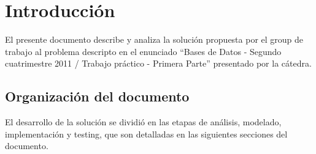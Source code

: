 \section{Introducci\'on}
El presente documento describe y analiza la soluci\'on propuesta por el group de trabajo al problema descripto en el 
enunciado ``Bases de Datos - Segundo cuatrimestre 2011 / Trabajo pr\'actico - Primera Parte'' presentado por la c\'atedra. \\

\subsection{Organizaci\'on del documento}
El desarrollo de la soluci\'on se dividi\'o en las etapas de an\'alisis, modelado, implementaci\'on y testing, que son detalladas
en las siguientes secciones del documento.

